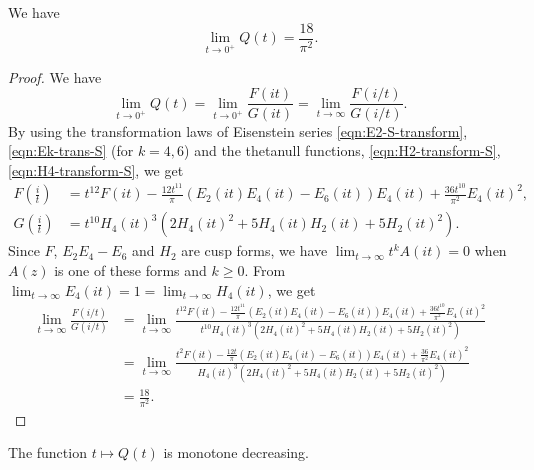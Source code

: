 \begin{lemma}\label{lemma:Qlim}
We have
\begin{equation}\label{eqn:Qlim}
    \lim_{t \to 0^+} Q(t) = \frac{18}{\pi^2}.
\end{equation}
\end{lemma}
\begin{proof}
We have
\begin{equation}
    \lim_{t \to 0^+} Q(t) = \lim_{t \to 0^+} \frac{F(it)}{G(it)} = \lim_{t \to \infty} \frac{F(i/t)}{G(i/t)}.
\end{equation}
By using the transformation laws of Eisenstein series \eqref{eqn:E2-S-transform}, \eqref{eqn:Ek-trans-S} (for $k = 4, 6$) and the thetanull functions, \eqref{eqn:H2-transform-S}, \eqref{eqn:H4-transform-S}, we get
\begin{align}
    F\left(\frac{i}{t}\right) &= t^{12} F(it) - \frac{12t^{11}}{\pi} (E_2(it)E_4(it) - E_6(it))E_4(it) + \frac{36t^{10}}{\pi^2}E_4(it)^2, \\
    G\left(\frac{i}{t}\right) &= t^{10} H_{4}(it)^{3}(2H_{4}(it)^{2} + 5 H_{4}(it)H_{2}(it) + 5 H_{2}(it)^{2}).
\end{align}
Since $F$, $E_2 E_4 - E_6$ and $H_2$ are cusp forms, we have $\lim_{t \to \infty}t^k A(it) = 0$ when $A(z)$ is one of these forms and $k \geq 0$.
From $\lim_{t \to \infty} E_4(it) = 1 = \lim_{t \to \infty}H_{4}(it)$, we get
\begin{align}
    \lim_{t \to \infty} \frac{F(i/t)}{G(i/t)}
    &= \lim_{t \to \infty} \frac{t^{12} F(it) - \frac{12t^{11}}{\pi} (E_2(it)E_4(it) - E_6(it))E_4(it) + \frac{36t^{10}}{\pi^2}E_4(it)^2}{t^{10} H_{4}(it)^{3}(2H_{4}(it)^{2} + 5 H_{4}(it)H_{2}(it) + 5 H_{2}(it)^{2})} \\
    &= \lim_{t \to \infty} \frac{t^{2} F(it) - \frac{12t}{\pi} (E_2(it)E_4(it) - E_6(it))E_4(it) + \frac{36}{\pi^2}E_4(it)^2}{H_{4}(it)^{3}(2H_{4}(it)^{2} + 5 H_{4}(it)H_{2}(it) + 5 H_{2}(it)^{2})} \\
    &= \frac{18}{\pi^2}.
\end{align}
\end{proof}

\begin{proposition}\label{prop:Qdec}
The function $t \mapsto Q(t)$ is monotone decreasing.
\end{proposition}

